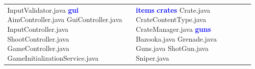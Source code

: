 \documentclass[a4paper, 12pt]{article}
\begin{document}
\begin{landscape}
\begin{table}[H]
\begin{tabular}{|p{5.5cm}|p{5.5cm}|p{5.5cm}|p{5.5cm}|}
                            \hspace*{0.4cm} InputValidator.java \newline
                        \textcolor{blue}{\textbf{gui}} \newline
                            \hspace*{0.4cm} AimController.java \newline
                            \hspace*{0.4cm} GuiController.java \newline
                            \hspace*{0.4cm} InputController.java \newline
                            \hspace*{0.4cm} ShootController.java \newline
                        GameController.java \newline
                        GameInitializationService.java
                        &
                        \textcolor{blue}{\textbf{items}} \newline
                            \hspace*{0.4cm} \textcolor{blue}{\textbf{crates}} \newline
                                \hspace*{0.8cm} Crate.java \newline
                                \hspace*{0.8cm} CrateContentType.java \newline
                                \hspace*{0.8cm} CrateManager.java \newline
                            \hspace*{0.4cm} \textcolor{blue}{\textbf{guns}} \newline
                                \hspace*{0.8cm} Bazooka.java \newline
                                \hspace*{0.8cm} Grenade.java \newline
                                \hspace*{0.8cm} Guns.java \newline
                                \hspace*{0.8cm} ShotGun.java \newline
                                \hspace*{0.8cm} Sniper.java \newline

\end{tabular}
\end{table}
\end{landscape}
\end{document}
